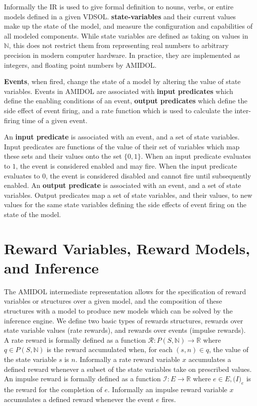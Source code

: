 \documentclass[11pt]{article}
\newcommand{\amidol}{\textsc{AMIDOL}}
\begin{document}
Informally the IR is used to give formal definition to nouns, verbs, or entire models defined in a given VDSOL. \textbf{state-variables} and their current values make up the state of the model, and measure the configuration and capabilities of all modeled components.  While state variables are defined as taking on values in $\mathbb{N}$, this does not restrict them from representing real numbers to arbitrary precision in modern computer hardware.  In practice, they are implemented as integers, and floating point numbers by \amidol{}.

\textbf{Events}, when fired, change the state of a model by altering the value of state variables.  Events in \amidol{} are associated with \textbf{input predicates} which define the enabling conditions of an event, \textbf{output predicates} which define the side effect of event firing, and a rate function which is used to calculate the inter-firing time of a given event.

An \textbf{input predicate} is associated with an event, and a set of state variables.  Input predicates are functions of the value of their set of variables which map these sets and their values onto the set $\{0, 1\}$.  When an input predicate evaluates to $1$, the event is considered enabled and may fire.  When the input predicate evaluates to $0$, the event is considered disabled and cannot fire until subsequently enabled.  An \textbf{output predicate} is associated with an event, and a set of state variables.  Output predicates map a set of state variables, and their values, to new values for the same state variables defining the side effects of event firing on the state of the model.

\section{Reward Variables, Reward Models, and Inference}

The \amidol{} intermediate representation allows for the specification of reward variables or structures over a given model, and the composition of these structures with a model to produce new models which can be solved by the inference engine.  We define two basic types of rewards structures, rewards over state variable values (rate rewards), and rewards over events (impulse rewards). \cite{qureshi1996algorithms,deavours1999efficient,ciardo1996well,sanders1991reduced}
A rate reward is formally defined as a function $\mathcal{R}: P(S, \mathbb{N}) \rightarrow \mathbb{R}$ where $q \in P(S, \mathbb{N})$ is the reward accumulated when, for each $(s,n) \in q$, the value of the state variable $s$ is $n$.  Informally a rate reward variable $x$ accumulates a defined reward whenever a subset of the state variables take on prescribed values. An impulse reward is formally defined as a function $\mathcal{I}: E \rightarrow \mathbb{R}$ where $e \in E, \mathcal(I)_e$ is the reward for the completion of $e$.  Informally an impulse reward variable $x$ accumulates a defined reward whenever the event $e$ fires.
\end{document}
